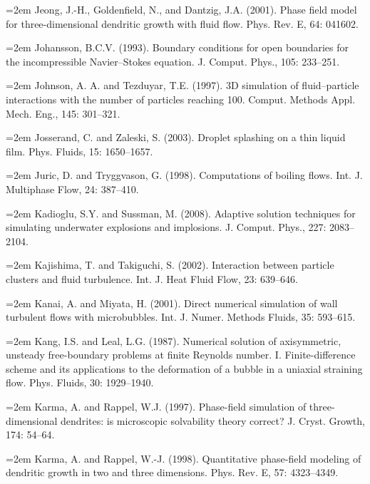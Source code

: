 \documentclass[11pt,a4paper,openany,fontset=none]{ctexbook}
\begin{document}
\par\hangindent=2em Jeong, J.-H., Goldenfield, N., and Dantzig, J.A. (2001). Phase field model for three-dimensional dendritic growth with fluid flow. Phys. Rev. E, 64: 041602.

\par\hangindent=2em Johansson, B.C.V. (1993). Boundary conditions for open boundaries for the incompressible Navier--Stokes equation. J. Comput. Phys., 105: 233--251.

\par\hangindent=2em Johnson, A. A. and Tezduyar, T.E. (1997). 3D simulation of fluid--particle interactions with the number of particles reaching 100. Comput. Methods Appl. Mech. Eng., 145: 301--321.

\par\hangindent=2em Josserand, C. and Zaleski, S. (2003). Droplet splashing on a thin liquid film. Phys. Fluids, 15: 1650--1657.

\par\hangindent=2em Juric, D. and Tryggvason, G. (1998). Computations of boiling flows. Int. J. Multiphase Flow, 24: 387--410.

\par\hangindent=2em Kadioglu, S.Y. and Sussman, M. (2008). Adaptive solution techniques for simulating underwater explosions and implosions. J. Comput. Phys., 227: 2083--2104.

\par\hangindent=2em Kajishima, T. and Takiguchi, S. (2002). Interaction between particle clusters and fluid turbulence. Int. J. Heat Fluid Flow, 23: 639--646.

\par\hangindent=2em Kanai, A. and Miyata, H. (2001). Direct numerical simulation of wall turbulent flows with microbubbles. Int. J. Numer. Methods Fluids, 35: 593--615.

\par\hangindent=2em Kang, I.S. and Leal, L.G. (1987). Numerical solution of axisymmetric, unsteady free-boundary problems at finite Reynolds number. I. Finite-difference scheme and its applications to the deformation of a bubble in a uniaxial straining flow. Phys. Fluids, 30: 1929--1940.

\par\hangindent=2em Karma, A. and Rappel, W.J. (1997). Phase-field simulation of three-dimensional dendrites: is microscopic solvability theory correct? J. Cryst. Growth, 174: 54--64.

\par\hangindent=2em Karma, A. and Rappel, W.-J. (1998). Quantitative phase-field modeling of dendritic growth in two and three dimensions. Phys. Rev. E, 57: 4323--4349.
\end{document}
